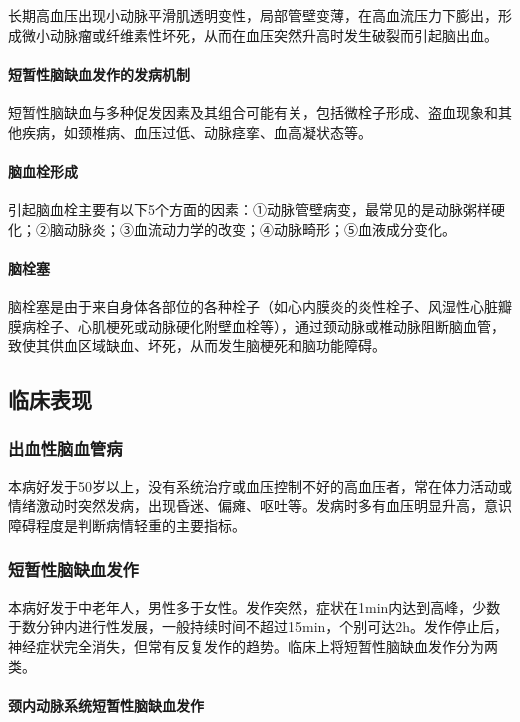 长期高血压出现小动脉平滑肌透明变性，局部管壁变薄，在高血流压力下膨出，形成微小动脉瘤或纤维素性坏死，从而在血压突然升高时发生破裂而引起脑出血。
\paragraph{短暂性脑缺血发作的发病机制}

短暂性脑缺血与多种促发因素及其组合可能有关，包括微栓子形成、盗血现象和其他疾病，如颈椎病、血压过低、动脉痉挛、血高凝状态等。
\paragraph{脑血栓形成}

引起脑血栓主要有以下5个方面的因素：①动脉管壁病变，最常见的是动脉粥样硬化；②脑动脉炎；③血流动力学的改变；④动脉畸形；⑤血液成分变化。
\paragraph{脑栓塞}

脑栓塞是由于来自身体各部位的各种栓子（如心内膜炎的炎性栓子、风湿性心脏瓣膜病栓子、心肌梗死或动脉硬化附壁血栓等），通过颈动脉或椎动脉阻断脑血管，致使其供血区域缺血、坏死，从而发生脑梗死和脑功能障碍。

\subsection{临床表现}

\subsubsection{出血性脑血管病}

本病好发于50岁以上，没有系统治疗或血压控制不好的高血压者，常在体力活动或情绪激动时突然发病，出现昏迷、偏瘫、呕吐等。发病时多有血压明显升高，意识障碍程度是判断病情轻重的主要指标。

\subsubsection{短暂性脑缺血发作}

本病好发于中老年人，男性多于女性。发作突然，症状在1min内达到高峰，少数于数分钟内进行性发展，一般持续时间不超过15min，个别可达2h。发作停止后，神经症状完全消失，但常有反复发作的趋势。临床上将短暂性脑缺血发作分为两类。
\paragraph{颈内动脉系统短暂性脑缺血发作}

